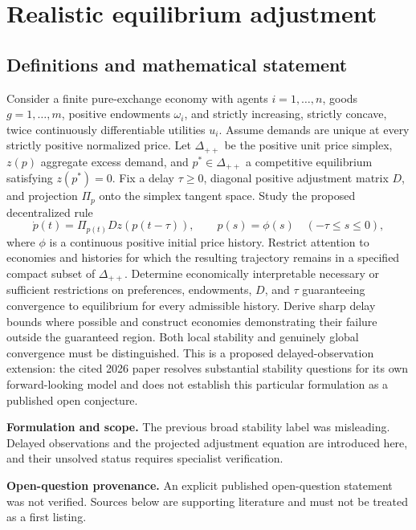 \documentclass[11pt]{article}
\begin{document}
\section*{Realistic equilibrium adjustment}\label{30007552}
\subsection{Definitions and mathematical statement}
Consider a finite pure-exchange economy with agents \(i=1,\ldots,n\), goods \(g=1,\ldots,m\), positive endowments \(\omega_i\), and strictly increasing, strictly concave, twice continuously differentiable utilities \(u_i\). Assume demands are unique at every strictly positive normalized price. Let \(\Delta_{++}\) be the positive unit price simplex, \(z(p)\) aggregate excess demand, and \(p^*\in\Delta_{++}\) a competitive equilibrium satisfying \(z(p^*)=0\). Fix a delay \(\tau\geq0\), diagonal positive adjustment matrix \(D\), and projection \(\Pi_p\) onto the simplex tangent space. Study the proposed decentralized rule
\[
 \dot p(t)=\Pi_{p(t)}D z(p(t-\tau)),\qquad p(s)=\phi(s)\quad(-\tau\leq s\leq0),
\]
where \(\phi\) is a continuous positive initial price history. Restrict attention to economies and histories for which the resulting trajectory remains in a specified compact subset of \(\Delta_{++}\). Determine economically interpretable necessary or sufficient restrictions on preferences, endowments, \(D\), and \(\tau\) guaranteeing convergence to equilibrium for every admissible history. Derive sharp delay bounds where possible and construct economies demonstrating their failure outside the guaranteed region. Both local stability and genuinely global convergence must be distinguished. This is a proposed delayed-observation extension: the cited 2026 paper resolves substantial stability questions for its own forward-looking model and does not establish this particular formulation as a published open conjecture.

\par\textbf{Formulation and scope.} The previous broad stability label was misleading. Delayed observations and the projected adjustment equation are introduced here, and their unsolved status requires specialist verification.

\par\textbf{Open-question provenance.} An explicit published open-question statement was not verified. Sources below are supporting literature and must not be treated as a first listing.
\end{document}
